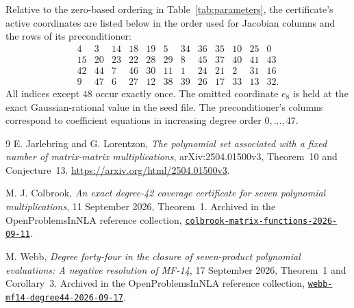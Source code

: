 \documentclass[11pt]{article}
\begin{document}
Relative to the zero-based ordering in Table~\ref{tab:parameters}, the
certificate's active coordinates are listed below in the order used for
Jacobian columns and the rows of its preconditioner:
\[
\begin{array}{rrrrrrrrrrrr}
4&3&14&18&19&5&34&36&35&10&25&0\\
15&20&23&22&28&29&8&45&37&40&41&43\\
42&44&7&46&30&11&1&24&21&2&31&16\\
9&47&6&27&12&38&39&26&17&33&13&32.
\end{array}
\]
All indices except $48$ occur exactly once. The omitted coordinate
$e_8$ is held at the exact Gaussian-rational value in the seed file.
The preconditioner's columns correspond to coefficient equations in
increasing degree order $0,\ldots,47$.

\begin{thebibliography}{9}
E. Jarlebring and G. Lorentzon,
\emph{The polynomial set associated with a fixed number of matrix-matrix
multiplications}, arXiv:2504.01500v3, Theorem~10 and Conjecture~13.
\url{https://arxiv.org/html/2504.01500v3}.

M. J. Colbrook,
\emph{An exact degree-42 coverage certificate for seven polynomial
multiplications}, 11 September 2026, Theorem~1.
Archived in the OpenProblemsInNLA reference collection,
\href{../colbrook-matrix-functions-2026-09-11/manuscripts/MF-14.pdf}
{\texttt{colbrook-matrix-functions-2026-09-11}}.

M. Webb,
\emph{Degree forty-four in the closure of seven-product polynomial
evaluations: A negative resolution of MF-14}, 17 September 2026,
Theorem~1 and Corollary~3.
Archived in the OpenProblemsInNLA reference collection,
\href{../webb-mf14-degree44-2026-09-17/proof.pdf}
{\texttt{webb-mf14-degree44-2026-09-17}}.
\end{thebibliography}
\end{document}
